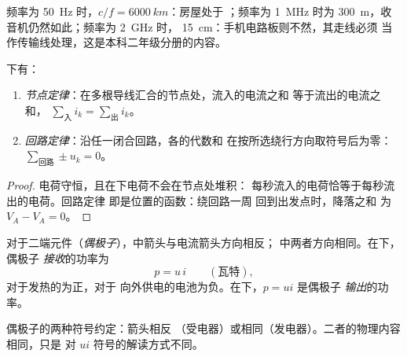 \begin{example}[准稳态有多准]\label{ex:b1:dc-circuits:arqs}
频率为 \qty{50}{Hz} 时，$c/f = \qty{6000}{km}$：房屋处于
；频率为 \qty{1}{MHz} 时为 \qty{300}{m}，收音机仍然如此；频率为 \qty{2}{GHz} 时，
\qty{15}{cm}：手机电路板则不然，其走线必须
当作传输线处理，这是本科二年级分册的内容。
\end{example}

\begin{theorem}[基尔霍夫定律]\label{thm:b1:dc-circuits:kirchhoff}
下有：
\begin{enumerate}
  \item \emph{节点定律}：在多根导线汇合的节点处，流入的电流之和
        等于流出的电流之和，
        $\sum_{\text{入}} i_k = \sum_{\text{出}} i_k$。
  \item \emph{回路定律}：沿任一闭合回路，各的代数和
        在按所选绕行方向取符号后为零：
        $\sum_{\text{回路}} \pm u_k = 0$。
\end{enumerate}
\end{theorem}

\begin{proof}
电荷守恒，且在下电荷不会在节点处堆积：
每秒流入的电荷恰等于每秒流出的电荷。回路定律
即是位置的函数：绕回路一周
回到出发点时，降落之和
为 $V_A - V_A = 0$。
\end{proof}

\begin{notation}[约定与功率]\label{not:b1:dc-circuits:conventions}
对于二端元件（\emph{偶极子}），\emph{}中箭头与电流箭头方向相反；
\emph{}中两者方向相同。在下，偶极子
\emph{接收}的功率为
%
\[
p = u\,i \qquad (\text{瓦特}),
\]
对于发热的为正，对于
向外供电的电池为负。在下，$p = ui$ 是偶极子
\emph{输出}的功率。
\end{notation}

\begin{omfigure}

{\small 偶极子的两种符号约定：箭头相反
（受电器）或相同（发电器）。二者的物理内容相同，只是
对 $ui$ 符号的解读方式不同。}
\end{omfigure}

